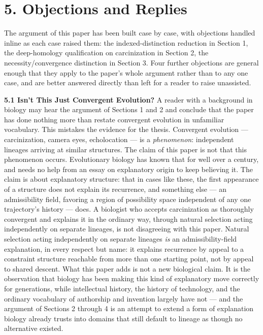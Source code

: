 \documentclass[11pt]{article}
\theoremstyle{plain}
\begin{document}
\section*{5. Objections and Replies}

The argument of this paper has been built case by case, with objections handled inline as each case raised them: the indexed-distinction reduction in Section 1, the deep-homology qualification on carcinization in Section 2, the necessity/convergence distinction in Section 3. Four further objections are general enough that they apply to the paper's whole argument rather than to any one case, and are better answered directly than left for a reader to raise unassisted.

\textbf{5.1 Isn't This Just Convergent Evolution?} A reader with a background in biology may hear the argument of Sections 1 and 2 and conclude that the paper has done nothing more than restate convergent evolution in unfamiliar vocabulary. This mistakes the evidence for the thesis. Convergent evolution --- carcinization, camera eyes, echolocation --- is a \emph{phenomenon}: independent lineages arriving at similar structures. The claim of this paper is not that this phenomenon occurs. Evolutionary biology has known that for well over a century, and needs no help from an essay on explanatory origin to keep believing it. The claim is about explanatory structure: that in cases like these, the first appearance of a structure does not explain its recurrence, and something else --- an admissibility field, favoring a region of possibility space independent of any one trajectory's history --- does. A biologist who accepts carcinization as thoroughly convergent and explains it in the ordinary way, through natural selection acting independently on separate lineages, is not disagreeing with this paper. Natural selection acting independently on separate lineages \emph{is} an admissibility-field explanation, in every respect but name: it explains recurrence by appeal to a constraint structure reachable from more than one starting point, not by appeal to shared descent. What this paper adds is not a new biological claim. It is the observation that biology has been making this kind of explanatory move correctly for generations, while intellectual history, the history of technology, and the ordinary vocabulary of authorship and invention largely have not --- and the argument of Sections 2 through 4 is an attempt to extend a form of explanation biology already trusts into domains that still default to lineage as though no alternative existed.
\end{document}
